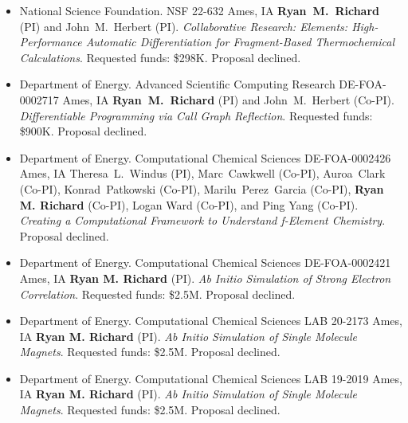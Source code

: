\begin{itemize}
{	}
	\item{
	      {National Science Foundation.}
		  {NSF 22-632}
		  {Ames, IA}
		  {}
		  {\textbf{Ryan~M.~Richard} (PI) and John~M.~Herbert (PI).
		   \textit{Collaborative Research: Elements: High-Performance Automatic 
		           Differentiation for Fragment-Based Thermochemical 
				   Calculations}.
		   Requested funds: \$298K. Proposal declined.
		  }
	}
	\item{
		{Department of Energy. Advanced Scientific Computing Research}
		{DE-FOA-0002717}
		{Ames, IA}
		{}
		{\textbf{Ryan~M.~Richard} (PI) and John~M.~Herbert (Co-PI).
		\textit{Differentiable Programming via Call Graph Reflection}.
		Requested funds: \$900K. Proposal declined.
		}
	}
	\item{
		{Department of Energy. Computational Chemical Sciences}
		{DE-FOA-0002426}
		{Ames, IA}
		{}
		{Theresa~L.~Windus (PI), Marc~Cawkwell (Co-PI), Auroa~Clark (Co-PI),
		Konrad~Patkowski (Co-PI), Marilu~Perez~Garcia (Co-PI),
		\textbf{Ryan M. Richard} (Co-PI), Logan Ward (Co-PI), and Ping Yang
		(Co-PI).
		\textit{Creating a Computational Framework to Understand 
		         \textit{f}-Element Chemistry}. Proposal declined.
		}
	}
	\item{
		{Department of Energy. Computational Chemical Sciences}
		{DE-FOA-0002421}
		{Ames, IA}
		{}
		{
		\textbf{Ryan M. Richard} (PI).
		\textit{Ab Initio Simulation of Strong Electron Correlation}. 
		Requested funds: \$2.5M.
		Proposal declined.
		}
	}
	\item{
		{Department of Energy. Computational Chemical Sciences}
		{LAB 20-2173}
		{Ames, IA}
		{}
		{
		\textbf{Ryan M. Richard} (PI).
		\textit{Ab Initio Simulation of Single Molecule Magnets}. 
		Requested funds: \$2.5M.
		Proposal declined.
		}
	}
	\item{
		{Department of Energy. Computational Chemical Sciences}
		{LAB 19-2019}
		{Ames, IA}
		{}
		{
		\textbf{Ryan M. Richard} (PI).
		\textit{Ab Initio Simulation of Single Molecule Magnets}. 
		Requested funds: \$2.5M.
		Proposal declined.
		}
	}
\end{itemize}
